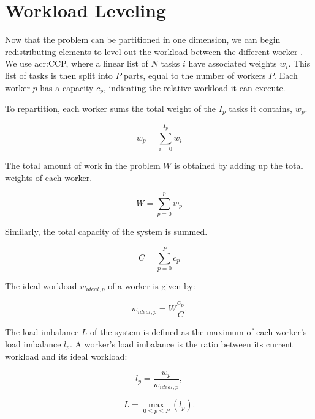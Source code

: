 \section{Workload Leveling}\label{section:load_balancing:workload_leveling}

Now that the problem can be partitioned in one dimension, we can begin redistributing elements to
level out the workload between the different worker . We use \acrlong{acr:CCP},
where a linear list of \(N\) tasks \(i\) have associated weights \(w_i\). This list of tasks is then
split into \(P\) parts, equal to the number of workers \(P\). Each worker \(p\) has a capacity
\(c_p\), indicating the relative workload it can execute.

To repartition, each worker sums the total weight of the \(I_p\) tasks it contains, \(w_p\).

\begin{equation}
    w_p = \sum_{i = 0}^{I_p}w_i
\end{equation}

\noindent
The total amount of work in the problem \(W\) is obtained by adding up the total weights of each
worker.

\begin{equation}
    W = \sum_{p = 0}^{p}w_p
\end{equation}

\noindent
Similarly, the total capacity of the system is summed.

\begin{equation}
    C = \sum_{p = 0}^{P}c_p
\end{equation}

\noindent
The ideal workload \(w_{ideal,p}\) of a worker is given by:

\begin{equation} \label{equ:ideal_workload}
    w_{ideal,p} = W \frac{c_p}{C}.
\end{equation}

The load imbalance \(L\) of the system is defined as the maximum of each worker's load imbalance
\(l_p\). A worker's load imbalance is the ratio between its current workload and its ideal workload:

\begin{equation}
    l_{p} = \frac{w_p}{w_{ideal,p}},
\end{equation}

\begin{equation} \label{equ:load_imbalance}
    L = \max_{0 \leq p \leq P}{(l_{p})}.
\end{equation}

